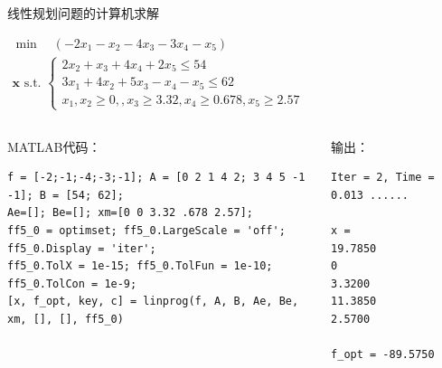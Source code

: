 \documentclass[12pt]{beamer}
\begin{document}
\begin{frame}[t,fragile]{线性规划问题的计算机求解}

\begin{example}[6-17]
	$\begin{array}{l}
	\min \quad \left(-2 x_{1}-x_{2}-4 x_{3}-3 x_{4}-x_{5}\right)\\
	\mathbf{x} \text { s.t. }\left\{\begin{array}{l}
	2 x_{2}+x_{3}+4 x_{4}+2 x_{5} \leqslant 54 \\
	3 x_{1}+4 x_{2}+5 x_{3}-x_{4}-x_{5} \leqslant 62 \\
	x_{1}, x_{2} \geqslant 0,, x_{3} \geqslant 3.32, x_{4} \geqslant 0.678, x_{5} \geqslant 2.57
	\end{array}\right.
	\end{array}
	$
\end{example}

	\begin{columns}[T]
			
	\begin{block}{MATLAB代码：}
\begin{lstlisting}
f = [-2;-1;-4;-3;-1]; A = [0 2 1 4 2; 3 4 5 -1 -1]; B = [54; 62];
Ae=[]; Be=[]; xm=[0 0 3.32 .678 2.57]; 
ff5_0 = optimset; ff5_0.LargeScale = 'off'; ff5_0.Display = 'iter';
ff5_0.TolX = 1e-15; ff5_0.TolFun = 1e-10; ff5_0.TolCon = 1e-9; 
[x, f_opt, key, c] = linprog(f, A, B, Ae, Be, xm, [], [], ff5_0)
\end{lstlisting}
	\end{block}	
			
			
	\begin{block}{输出：}
\begin{lstlisting}
Iter = 2, Time = 0.013 ......

x =
19.7850
0
3.3200
11.3850
2.5700

f_opt = -89.5750
\end{lstlisting}
	\end{block}

	\end{columns}		

\end{frame}
\end{document}
